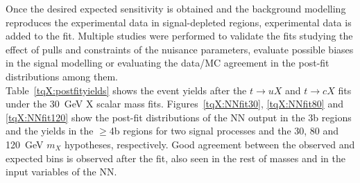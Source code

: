 Once the desired expected sensitivity is obtained and the background modelling reproduces the experimental data in signal-depleted regions, experimental data is added to the fit. Multiple studies were performed to validate the fits studying the effect of pulls and constraints of the nuisance parameters, evaluate possible biases in the signal modelling or evaluating the data/MC agreement in the post-fit distributions among them.\\

Table~\ref{tqX:postfityields} shows the event yields after the $t\to uX$ and $t\to cX$ fits under the 30~GeV X scalar mass fits. Figures~\ref{tqX:NNfit30}, \ref{tqX:NNfit80} and \ref{tqX:NNfit120} show the post-fit distributions of the NN output in the 3b regions and the yields in the $\geq$4b regions for two signal processes and the 30, 80 and 120~GeV $m_X$ hypotheses, respectively. Good agreement between the observed and expected bins is observed after the fit, also seen in the rest of masses and in the input variables of the NN. 

